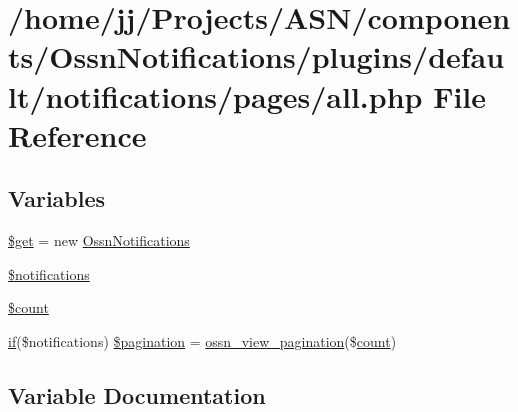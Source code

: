 \hypertarget{_ossn_notifications_2plugins_2default_2notifications_2pages_2all_8php}{}\section{/home/jj/\+Projects/\+A\+S\+N/components/\+Ossn\+Notifications/plugins/default/notifications/pages/all.php File Reference}
\label{_ossn_notifications_2plugins_2default_2notifications_2pages_2all_8php}
\subsection*{Variables}
\begin{DoxyCompactItemize}
\item 
\hyperlink{_ossn_notifications_2plugins_2default_2notifications_2pages_2all_8php_a6dba07cf5cb37f05ef89d2b9afacf046}{\$get} = new \hyperlink{class_ossn_notifications}{Ossn\+Notifications}
\item 
\hyperlink{_ossn_notifications_2plugins_2default_2notifications_2pages_2all_8php_a51df68467e9bf7825dfa9f38d45e9404}{\$notifications}
\item 
\hyperlink{_ossn_notifications_2plugins_2default_2notifications_2pages_2all_8php_af789423037bbc89dc7c850e761177570}{\$count}
\item 
\hyperlink{jquery_8tokeninput_8js_ad8dd46a3cbc004569e34401e9e71771a}{if}(\$notifications) \hyperlink{_ossn_notifications_2plugins_2default_2notifications_2pages_2all_8php_ae3265141c285fe5ca304d727bccf8536}{\$pagination} = \hyperlink{ossn_8lib_8views_8php_a781fc073a71d40fdf9002a692c8cc553}{ossn\+\_\+view\+\_\+pagination}(\$\hyperlink{photos_2pages_2photos_8php_a364678aa3bd05301b3d1b8650653cf48}{count})
\end{DoxyCompactItemize}


\subsection{Variable Documentation}
